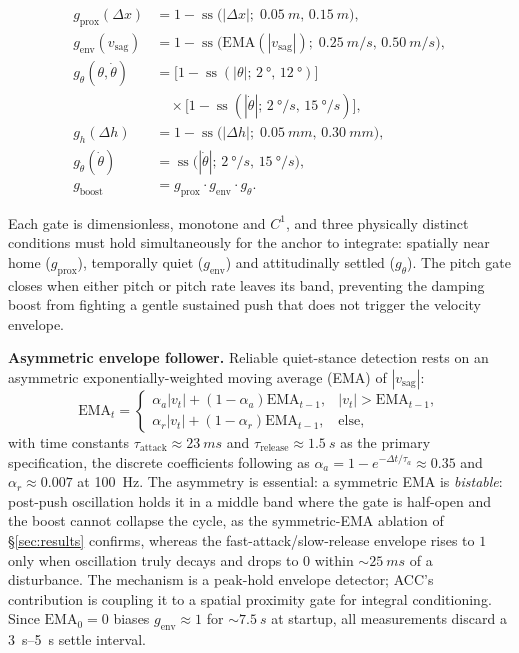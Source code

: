 \documentclass{jcd}
\begin{document}
\begin{align}
g_{\text{prox}}(\Delta x) &= 1 - \operatorname{ss}\bigl(|\Delta x|;\;\SI{0.05}{m},\,\SI{0.15}{m}\bigr),
\label{eq:g_prox}\\[2pt]
g_{\text{env}}(v_{\text{sag}}) &= 1 - \operatorname{ss}\bigl(\mathrm{EMA}(|v_{\text{sag}}|);\;\SI{0.25}{m/s},\,\SI{0.50}{m/s}\bigr),
\label{eq:g_env}\\[2pt]
g_\theta(\theta,\dot{\theta}) &= \bigl[1 - \operatorname{ss}(|\theta|;\,\SI{2}{\degree},\,\SI{12}{\degree})\bigr] \nonumber\\
&\quad\times \bigl[1 - \operatorname{ss}(|\dot{\theta}|;\,\SI{2}{\degree/s},\,\SI{15}{\degree/s})\bigr],
\label{eq:g_theta}\\[2pt]
g_h(\Delta h) &= 1 - \operatorname{ss}\bigl(|\Delta h|;\;\SI{0.05}{mm},\,\SI{0.30}{mm}\bigr),
\label{eq:g_h}\\[2pt]
g_{\dot{\theta}}(\dot{\theta}) &= \operatorname{ss}\bigl(|\dot{\theta}|;\,\SI{2}{\degree/s},\,\SI{15}{\degree/s}\bigr),
\label{eq:g_thetadot}\\[2pt]
g_{\text{boost}} &= g_{\text{prox}}\cdot g_{\text{env}}\cdot g_\theta.
\label{eq:g_boost}
\end{align}

Each gate is dimensionless, monotone and $C^1$, and three physically distinct
conditions must hold simultaneously for the anchor to integrate: spatially near
home ($g_{\text{prox}}$), temporally quiet ($g_{\text{env}}$) and attitudinally
settled ($g_\theta$). The pitch gate closes when either pitch or pitch rate
leaves its band, preventing the damping boost from fighting a gentle sustained
push that does not trigger the velocity envelope.

\textbf{Asymmetric envelope follower.} Reliable quiet-stance detection rests on
an asymmetric exponentially-weighted moving average (EMA) of $|v_{\text{sag}}|$:
\begin{equation}
\text{EMA}_t = \begin{cases}
\alpha_a|v_t| + (1{-}\alpha_a)\text{EMA}_{t-1}, & |v_t| > \text{EMA}_{t-1},\\
\alpha_r|v_t| + (1{-}\alpha_r)\text{EMA}_{t-1}, & \text{else},
\end{cases}
\label{eq:asym_ema}
\end{equation}
with time constants $\tau_{\text{attack}}{\approx}\SI{23}{ms}$ and
$\tau_{\text{release}}{\approx}\SI{1.5}{s}$ as the primary specification, the
discrete coefficients following as $\alpha_a{=}1{-}e^{-\Delta t/\tau_{a}}
\approx 0.35$ and $\alpha_r \approx 0.007$ at \SI{100}{Hz}. The asymmetry is
essential: a symmetric EMA is \emph{bistable}: post-push oscillation holds it
in a middle band where the gate is half-open and the boost cannot collapse the
cycle, as the symmetric-EMA ablation of \S\ref{sec:results} confirms, whereas the fast-attack/slow-release envelope rises to $1$ only when oscillation truly
decays and drops to $0$ within ${\sim}\SI{25}{ms}$ of a disturbance. The
mechanism is a peak-hold envelope detector; ACC's contribution is coupling it to
a spatial proximity gate for integral conditioning. Since $\text{EMA}_0{=}0$
biases $g_{\text{env}}{\approx}1$ for ${\sim}\SI{7.5}{s}$ at startup, all
measurements discard a \SIrange{3}{5}{s} settle interval.
\end{document}
